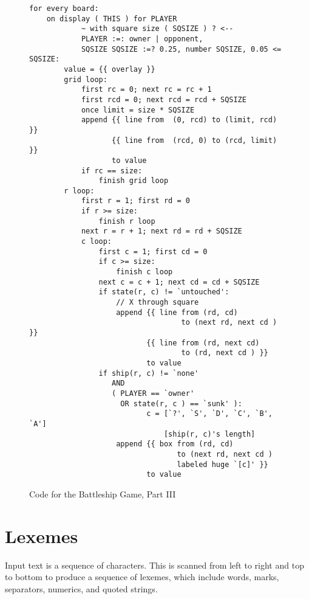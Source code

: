 \documentclass[12pt]{article}
\newlength{\figurewidth}
\newenvironment{boxedfigure}[1][!btp]%
	{\begin{figure*}[#1]
	 \begin{lrbox}{\figurebox}
	 \begin{minipage}{\figurewidth}

	 \vspace*{1ex}}%
	{
	 \vspace*{1ex}

	 \end{minipage}
	 \end{lrbox}
	 \begin{center}
	 \fbox{\hspace*{0.1in}\usebox{\figurebox}\hspace*{0.1in}}
	 \end{center}
	 \end{figure*}}
\begin{document}
\begin{boxedfigure}

\footnotesize

\begin{verbatim}
for every board:
    on display ( THIS ) for PLAYER
            ~ with square size ( SQSIZE ) ? <--
            PLAYER :=: owner | opponent,
            SQSIZE SQSIZE :=? 0.25, number SQSIZE, 0.05 <= SQSIZE:
        value = {{ overlay }}
        grid loop:
            first rc = 0; next rc = rc + 1
            first rcd = 0; next rcd = rcd + SQSIZE
            once limit = size * SQSIZE
            append {{ line from  (0, rcd) to (limit, rcd) }}
                   {{ line from  (rcd, 0) to (rcd, limit) }}
                   to value
            if rc == size:
                finish grid loop
        r loop:
            first r = 1; first rd = 0
            if r >= size:
                finish r loop
            next r = r + 1; next rd = rd + SQSIZE
            c loop:
                first c = 1; first cd = 0
                if c >= size:
                    finish c loop
                next c = c + 1; next cd = cd + SQSIZE
                if state(r, c) != `untouched':
                    // X through square
                    append {{ line from (rd, cd)
                                   to (next rd, next cd ) }}
                           {{ line from (rd, next cd)
                                   to (rd, next cd ) }}
                           to value
                if ship(r, c) != `none'
                   AND
                   ( PLAYER == `owner'
                     OR state(r, c ) == `sunk' ):
                           c = [`?', `S', `D', `C', `B', `A']
                               [ship(r, c)'s length]
                    append {{ box from (rd, cd)
                                  to (next rd, next cd )
                                  labeled huge `[c]' }}
                           to value
\end{verbatim}\vspace{-4ex}

\caption{Code for the Battleship Game, Part III}
\label{CODE-FOR-BATTLESHIP-3}
\end{boxedfigure}

\newpage

\section{Lexemes}

Input text is a sequence of characters.  This is scanned from
left to right and top to bottom to produce a sequence of lexemes,
which include words, marks, separators, numerics, and quoted strings.
\end{document}
